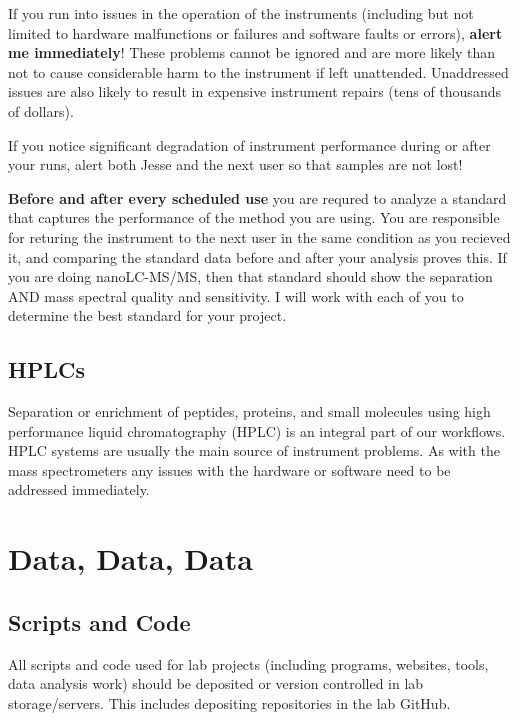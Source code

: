 \documentclass[
]{book}
\begin{document}
If you run into issues in the operation of the instruments (including but not limited to hardware malfunctions or failures and software faults or errors), \textbf{alert me immediately}! These problems cannot be ignored and are more likely than not to cause considerable harm to the instrument if left unattended. Unaddressed issues are also likely to result in expensive instrument repairs (tens of thousands of dollars).

If you notice significant degradation of instrument performance during or after your runs, alert both Jesse and the next user so that samples are not lost!

\textbf{Before and after every scheduled use} you are requred to analyze a standard that captures the performance of the method you are using. You are responsible for returing the instrument to the next user in the same condition as you recieved it, and comparing the standard data before and after your analysis proves this. If you are doing nanoLC-MS/MS, then that standard should show the separation AND mass spectral quality and sensitivity. I will work with each of you to determine the best standard for your project.

\hypertarget{hplcs}{%
\subsection{HPLCs}\label{hplcs}}

Separation or enrichment of peptides, proteins, and small molecules using high performance liquid chromatography (HPLC) is an integral part of our workflows. HPLC systems are usually the main source of instrument problems. As with the mass spectrometers any issues with the hardware or software need to be addressed immediately.

\hypertarget{data-data-data}{%
\section{Data, Data, Data}\label{data-data-data}}

\hypertarget{scripts-and-code}{%
\subsection{Scripts and Code}\label{scripts-and-code}}

All scripts and code used for lab projects (including programs, websites, tools, data analysis work) should be deposited or version controlled in lab storage/servers. This includes depositing repositories in the lab GitHub.
\end{document}
